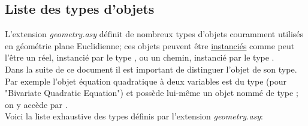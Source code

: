 \documentclass[pdftex]{article}
\newcommand{\geo}{l'extension \emph{geometry.asy}\xspace}
\newcommand{\Geo}{L'extension \emph{geometry.asy}\xspace}
\begin{document}
%
\subsection{Liste des types d'objets}
\Geo définit de nombreux types d'objets couramment utilisés en géométrie plane
Euclidienne;          ces         objets          peuvent         être
\href{http://www.tout-savoir.net/lexique/definition/3814/instancier/}{instanciés}
comme peut  l'être un réel, instancié  par le type  , ou un
chemin, instancié par le type .\\
Dans la suite de ce document il est important de distinguer l'objet de
son type.
Par exemple l'objet \og{}équation quadratique à deux variables\fg{} est du type
 (pour "Bivariate Quadratic Equation") et possède lui-même
un objet nommé  de type ; on y accède par .\\
Voici la liste exhaustive des types définis par \geo:
\end{document}
